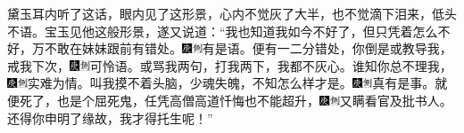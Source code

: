 黛玉耳内听了这话，眼内见了这形景，心内不觉灰了大半，也不觉滴下泪来，低头不语。宝玉见他这般形景，遂又说道：``我也知道我如今不好了，但只凭着怎么不好，万不敢在妹妹跟前有错处。{\includegraphics[width=3mm]{../Images/00004}\includegraphics[width=3mm]{../Images/00011}\footnotesize \kaishu 有是语。}便有一二分错处，你倒是或教导我，戒我下次，{\includegraphics[width=3mm]{../Images/00004}\includegraphics[width=3mm]{../Images/00011}\footnotesize \kaishu 可怜语。}或骂我两句，打我两下，我都不灰心。谁知你总不理我，{\includegraphics[width=3mm]{../Images/00004}\includegraphics[width=3mm]{../Images/00011}\footnotesize \kaishu 实难为情。}叫我摸不着头脑，少魂失魄，不知怎么样才是。{\includegraphics[width=3mm]{../Images/00004}\includegraphics[width=3mm]{../Images/00011}\footnotesize \kaishu 真有是事。}就便死了，也是个屈死鬼，任凭高僧高道忏悔也不能超升，{\includegraphics[width=3mm]{../Images/00004}\includegraphics[width=3mm]{../Images/00011}\footnotesize \kaishu 又瞒看官及批书人。}还得你申明了缘故，我才得托生呢！''

